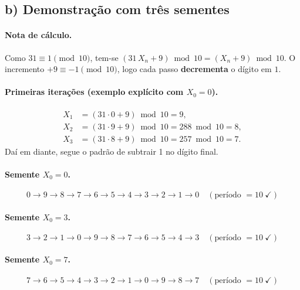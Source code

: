 \documentclass[12pt,a4paper]{article}
\theoremstyle{definition}
\begin{document}
\subsection{b) Demonstra\c{c}\~ao com tr\^es sementes}

\paragraph{Nota de c\'alculo.}
Como $31 \equiv 1\pmod{10}$, tem-se $(31\,X_n + 9)\bmod 10 = (X_n + 9)\bmod 10$.
O incremento $+9 \equiv -1\pmod{10}$, logo cada passo \textbf{decrementa} o d\'igito em $1$.

\paragraph{Primeiras itera\c{c}\~oes (exemplo expl\'icito com $X_0=0$).}
\begin{align}
  X_1 &= (31\cdot 0 + 9)\bmod 10 = 9,\\
  X_2 &= (31\cdot 9 + 9)\bmod 10 = 288\bmod 10 = 8,\\
  X_3 &= (31\cdot 8 + 9)\bmod 10 = 257\bmod 10 = 7.
\end{align}
Da\'i em diante, segue o padr\~ao de subtrair 1 no d\'igito final.

\paragraph{Semente $X_0 = 0$.}
\begin{equation}
  0 \to 9 \to 8 \to 7 \to 6 \to 5 \to 4 \to 3 \to 2 \to 1 \to 0 \quad
  (\text{per\'iodo } = 10\ \checkmark)
\end{equation}

\paragraph{Semente $X_0 = 3$.}
\begin{equation}
  3 \to 2 \to 1 \to 0 \to 9 \to 8 \to 7 \to 6 \to 5 \to 4 \to 3 \quad
  (\text{per\'iodo } = 10\ \checkmark)
\end{equation}

\paragraph{Semente $X_0 = 7$.}
\begin{equation}
  7 \to 6 \to 5 \to 4 \to 3 \to 2 \to 1 \to 0 \to 9 \to 8 \to 7 \quad
  (\text{per\'iodo } = 10\ \checkmark)
\end{equation}
\end{document}
